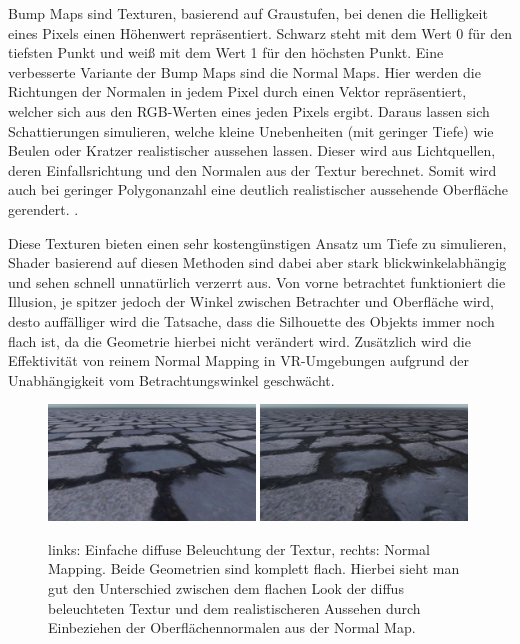 Bump Maps sind Texturen, basierend auf Graustufen, bei denen die Helligkeit eines Pixels
einen Höhenwert repräsentiert. Schwarz steht mit dem Wert 0 für den tiefsten Punkt und weiß mit dem Wert 1 für den höchsten Punkt.
Eine verbesserte Variante der Bump Maps sind die Normal Maps.
Hier werden die Richtungen der Normalen in jedem Pixel durch einen Vektor repräsentiert,
welcher sich aus den RGB-Werten eines jeden Pixels ergibt. Daraus lassen sich Schattierungen simulieren,
welche kleine Unebenheiten (mit geringer Tiefe) wie Beulen oder Kratzer realistischer aussehen lassen.
Dieser wird aus Lichtquellen, deren Einfallsrichtung und den Normalen aus der Textur berechnet.
Somit wird auch bei geringer Polygonanzahl eine deutlich realistischer aussehende Oberfläche gerendert.
\parencite{Cohen1998}.

Diese Texturen bieten einen sehr kostengünstigen
Ansatz um Tiefe zu simulieren, Shader basierend auf diesen Methoden sind dabei aber stark
blickwinkelabhängig und sehen schnell unnatürlich verzerrt aus.
Von vorne betrachtet funktioniert die Illusion, je spitzer jedoch der Winkel zwischen Betrachter und
Oberfläche wird, desto auffälliger wird die Tatsache, dass die Silhouette des Objekts immer
noch flach ist, da die Geometrie hierbei nicht verändert wird.
Zusätzlich wird die Effektivität von reinem Normal Mapping in VR-Umgebungen aufgrund der Unabhängigkeit vom Betrachtungswinkel
geschwächt. 

\begin{figure}[h!t]
	\centering
	\includegraphics[width=0.49\textwidth]{Grafiken/Basics/Mapping/Vergleich_Diffuse.png}
	\includegraphics[width=0.49\textwidth]{Grafiken/Basics/Mapping/Vergleich_Normal.png}
	\begin{footnotesize}
		\caption{links: Einfache diffuse Beleuchtung der Textur, rechts: Normal Mapping. Beide Geometrien sind komplett flach. 
		Hierbei sieht man gut den Unterschied zwischen dem flachen Look
		der diffus beleuchteten Textur und dem realistischeren Aussehen durch Einbeziehen der Oberflächennormalen aus der Normal Map.}
	\end{footnotesize}
\end{figure}

